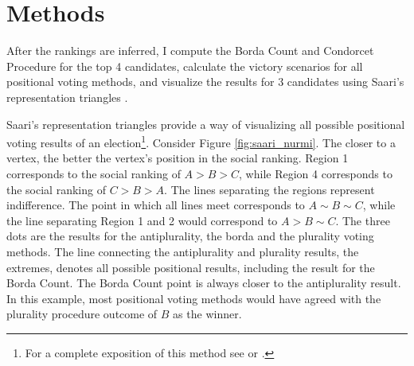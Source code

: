 \documentclass[hidelinks,11pt]{article}
\begin{document}
\begin{table}[]\centering
{}
\caption{Frequency of pairwise comparisons in the dataset.}

\label{Tab:Tcpairwise}
\end{table}


\section{Methods}



After the rankings are inferred, I compute the Borda Count and Condorcet Procedure for the top
4 candidates, calculate the victory scenarios for all positional voting methods,  and visualize the results for 3 candidates using Saari's representation triangles \parencite{saari2012geometry}.

Saari's representation triangles provide a way of visualizing all possible
positional voting results of an election\footnote{For a complete exposition of
  this method see \textcite{saari1995basic} or \textcite{nurmi2002voting}.}. Consider Figure \ref{fig:saari_nurmi}. The closer to a vertex, the better the vertex's position in the social ranking. Region 1 corresponds to the social ranking of \(A > B > C\), while Region 4 corresponds to the social ranking of \(C>B>A\). The lines separating the regions represent indifference. The point in which all lines meet corresponds to \(A \sim B \sim C\), while the line separating Region 1 and 2 would correspond to \(A > B \sim C\). The three dots are the results for the antiplurality, the borda and the plurality voting methods. The line connecting the antiplurality and plurality results, the extremes, denotes all possible positional results, including the result for the Borda Count. The Borda Count point is always closer to the antiplurality result. In this example, most positional voting methods would have agreed with the plurality procedure outcome of \(B\) as the winner.
\end{document}
